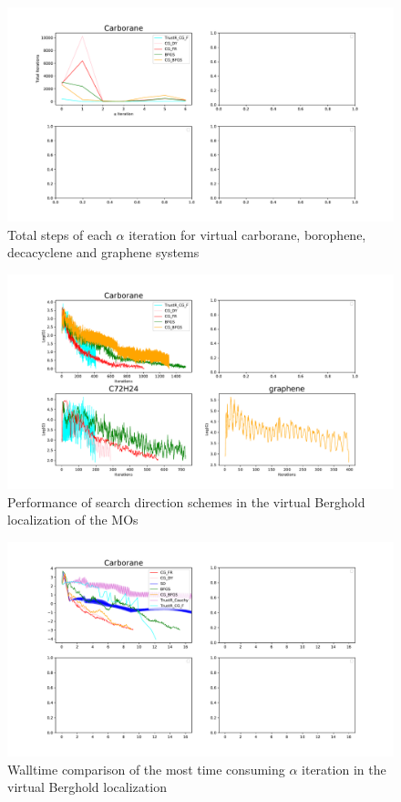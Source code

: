 \documentclass[aps,prl,reprint,amsmath,amssymb]{revtex4-1}
\begin{document}
\begin{figure}[htb]
\centering
\includegraphics[width=\textwidth]{virtual_iter.pdf}
\caption{Total steps of each $\alpha$ iteration for virtual carborane, borophene, decacyclene and graphene systems}
\label{fig:vir_iter}
\end{figure}

\begin{figure}[htb]
\centering
\includegraphics[width=\textwidth]{virtual_grad.pdf}
\caption{Performance of search direction schemes in the virtual Berghold localization of the MOs}
\label{fig:vir_grad}
\end{figure}


\begin{figure}[htb]
\centering
\includegraphics[width=\textwidth]{virtual_walltime.pdf}
\caption{Walltime comparison of the most time consuming $\alpha$ iteration in the virtual Berghold localization}
\label{fig:vir_walltime}
\end{figure}
\end{document}
